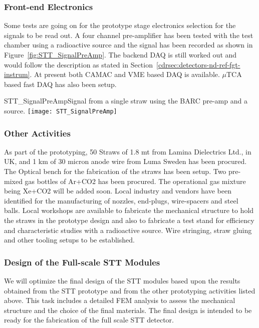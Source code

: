 \subsubsection{Front-end Electronics} 

Some tests are going on for the prototype stage electronics selection for the signals to be read out. 
A four channel pre-amplifier has been tested with the test chamber using a radioactive source and the 
signal has been recorded as shown in Figure~\ref{fig:STT_SignalPreAmp}. 
The backend DAQ is still worked out and would follow 
the description as stated in Section~\ref{cdrsec:detectors-nd-ref-fgt-instrum}. At present both CAMAC 
and VME based DAQ is available. $\mu$TCA based fast DAQ has also been setup.

\begin{cdrfigure}  
{STT_SignalPreAmp}{Signal from a single straw using the BARC pre-amp and a source.}  
\texttt{[image: STT\_SignalPreAmp]}
\end{cdrfigure}


\subsubsection{Other Activities}

As part of the prototyping, 50 Straws of 1.8 mt from Lamina Dielectrics Ltd., in UK, and 1 km of 30 micron 
anode wire from Luma Sweden has been procured. The Optical bench for the fabrication of the straws has been setup. 
Two pre-mixed gas bottles of Ar+CO2 has been procured. The operational gas mixture being Xe+CO2 will 
be added soon. Local industry and vendors have been identified for the manufacturing of nozzles, 
end-plugs, wire-spacers and steel balls. Local workshops are available to fabricate the mechanical 
structure to hold the straws in the prototype design and also to fabricate a test stand for efficiency 
and characteristic studies with a radioactive source. Wire stringing, straw gluing and other tooling 
setups to be established.


\subsubsection{Design of the Full-scale STT Modules} 
 
We will optimize the final design of the STT modules based upon the results obtained from the STT prototype 
and from the other prototyping activities listed above. This task includes a detailed FEM analysis to 
assess the mechanical structure and the choice of the final materials. The final design is intended to be 
ready for the fabrication of the full scale STT detector. 



